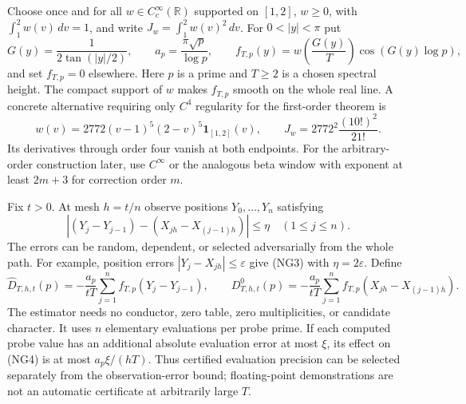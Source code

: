Choose once and for all $w\in C_c^\infty(\mathbb R)$ supported on $[1,2]$,
$w\ge0$, with
$\int_1^2 w(v)\,dv=1$, and write $J_w=\int_1^2w(v)^2\,dv$.
For $0<|y|<\pi$ put
\[
 G(y)=\frac1{2\tan(|y|/2)},\qquad
 a_p=\frac{\pi\sqrt p}{\log p},\qquad
 f_{T,p}(y)=w\!\left(\frac{G(y)}T\right)
                    \cos(G(y)\log p),                         \tag{NG1}
\]
and set $f_{T,p}=0$ elsewhere.  Here $p$ is a prime and $T\ge2$ is a
chosen spectral height.  The compact support of $w$ makes $f_{T,p}$ smooth
on the whole real line.  A concrete alternative requiring only $C^4$
regularity for the first-order theorem is
\[
 w(v)=2772(v-1)^5(2-v)^5\mathbf1_{[1,2]}(v),\qquad
 J_w=2772^2\frac{(10!)^2}{21!}.                         \tag{NG2}
\]
Its derivatives through order four vanish at both endpoints.  For the
arbitrary-order construction later, use $C^\infty$ or the analogous
beta window with exponent at least $2m+3$ for correction order $m$.

Fix $t>0$.  At mesh $h=t/n$ observe positions $Y_0,\ldots,Y_n$ satisfying
\[
 \left|(Y_j-Y_{j-1})-(X_{jh}-X_{(j-1)h})\right|\le\eta
 \quad(1\le j\le n).                                      \tag{NG3}
\]
The errors can be random, dependent, or selected adversarially from the
whole path.  For example, position errors $|Y_j-X_{jh}|\le\varepsilon$
give (NG3) with $\eta=2\varepsilon$.  Define
\[
 \widehat D_{T,h,t}(p)
   =-\frac{a_p}{tT}\sum_{j=1}^n f_{T,p}(Y_j-Y_{j-1}),\qquad
 D^0_{T,h,t}(p)
   =-\frac{a_p}{tT}\sum_{j=1}^n f_{T,p}(X_{jh}-X_{(j-1)h}).   \tag{NG4}
\]
The estimator needs no conductor, zero table, zero multiplicities, or
candidate character.  It uses $n$ elementary evaluations per probe prime.
If each computed probe value has an additional absolute evaluation error
at most $\xi$, its effect on (NG4) is at most $a_p\xi/(hT)$.
Thus certified evaluation precision can be selected separately from the
observation-error bound; floating-point demonstrations are not an
automatic certificate at arbitrarily large $T$.

